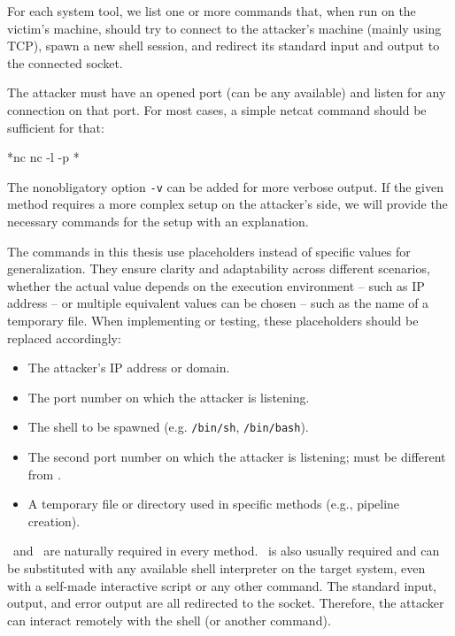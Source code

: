 
For each system tool, we list one or more commands that, when run on the victim's machine, should try to connect to the attacker's machine (mainly using TCP), spawn a new shell session, and redirect its standard input and output to the connected socket.

The attacker must have an opened port (can be any available) and listen for any connection on that port. For most cases, a simple netcat command should be sufficient for that:

\begin{cmdline}{*}{nc}{}
nc -l -p *\port*
\end{cmdline}

The nonobligatory option \texttt{-v} can be added for more verbose output. If the given method requires a more complex setup on the attacker's side, we will provide the necessary commands for the setup with an explanation.

The commands in this thesis use placeholders instead of specific values for generalization. They ensure clarity and adaptability across different scenarios, whether the actual value depends on the execution environment -- such as IP address -- or multiple equivalent values can be chosen -- such as the name of a temporary file. When implementing or testing, these placeholders should be replaced accordingly:

\setlength{\leftmargini}{5em}
\begin{itemize}
\item[\host] The attacker's IP address or domain.
\item[\port] The port number on which the attacker is listening.
\item[\shell] The shell to be spawned (e.g. \texttt{/bin/sh}, \texttt{/bin/bash}).
\item[\portt] The second port number on which the attacker is listening; must be different from \port.
\item[\tmp] A temporary file or directory used in specific methods (e.g., pipeline creation).
\end{itemize}
\setlength{\leftmargini}{2.5em}

\host\ and \port\ are naturally required in every method. \shell\ is also usually required and can be substituted with any available shell interpreter on the target system, even with a self-made interactive script or any other command. The standard input, output, and error output are all redirected to the socket. Therefore, the attacker can interact remotely with the shell (or another command).


